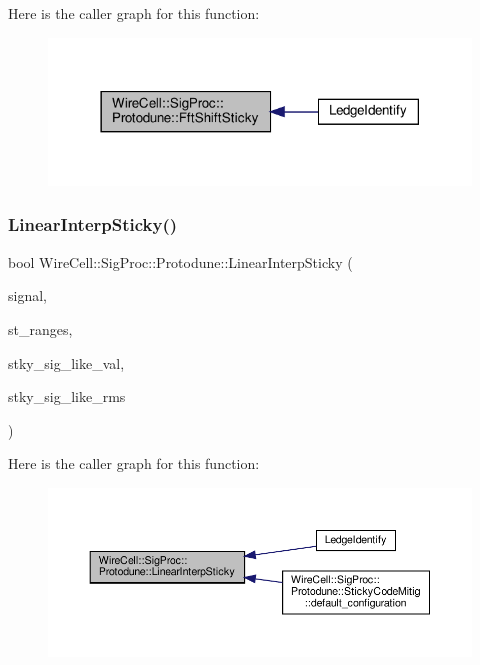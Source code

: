 Here is the caller graph for this function\+:
\nopagebreak
\begin{figure}[H]
\begin{center}
\leavevmode
\includegraphics[width=318pt]{namespace_wire_cell_1_1_sig_proc_1_1_protodune_a4a864612af01dc605e073a79fc261940_icgraph}
\end{center}
\end{figure}
\mbox{\label{namespace_wire_cell_1_1_sig_proc_1_1_protodune_afc41e8e05bb63814539ac2f89360c0de}} 
\subsubsection{\texorpdfstring{Linear\+Interp\+Sticky()}{LinearInterpSticky()}}
{\footnotesize\ttfamily bool Wire\+Cell\+::\+Sig\+Proc\+::\+Protodune\+::\+Linear\+Interp\+Sticky (\begin{DoxyParamCaption}\item[{\hyperlink{namespace_wire_cell_1_1_waveform_a479175e541c8545e87cd8063b74b6956}{Wire\+Cell\+::\+Waveform\+::realseq\+\_\+t} \&}]{signal,  }\item[{std\+::vector$<$ std\+::pair$<$ int, int $>$ $>$ \&}]{st\+\_\+ranges,  }\item[{float}]{stky\+\_\+sig\+\_\+like\+\_\+val,  }\item[{float}]{stky\+\_\+sig\+\_\+like\+\_\+rms }\end{DoxyParamCaption})}

Here is the caller graph for this function\+:
\nopagebreak
\begin{figure}[H]
\begin{center}
\leavevmode
\includegraphics[width=350pt]{namespace_wire_cell_1_1_sig_proc_1_1_protodune_afc41e8e05bb63814539ac2f89360c0de_icgraph}
\end{center}
\end{figure}
